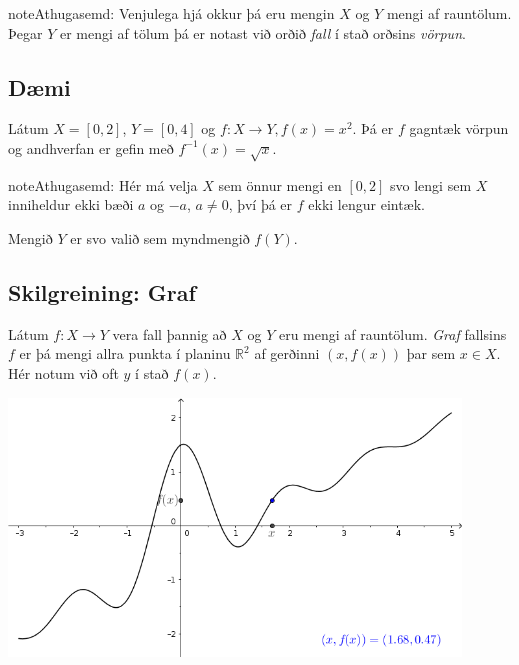 \documentclass[a4paper,10pt,icelandic]{sphinxmanual}
\begin{document}

\begin{notice}{note}{Athugasemd:}
Venjulega hjá okkur þá eru mengin \(X\) og \(Y\)
mengi af rauntölum. Þegar \(Y\) er mengi af tölum þá er notast við
orðið \textit{fall} í stað orðsins \emph{vörpun}.
\end{notice}


\subsection{Dæmi}
\label{kafli01:index-9}\label{kafli01:id2}
Látum \(X=[0,2]\), \(Y=[0,4]\) og \(f:X \to Y, f(x) = x^2\).
Þá er \(f\) gagntæk vörpun og andhverfan er gefin með
\(f^{-1}(x) = \sqrt x\).


\begin{notice}{note}{Athugasemd:}
Hér má velja \(X\) sem önnur mengi en \([0,2]\) svo lengi sem
\(X\) inniheldur ekki bæði \(a\) og \(-a\), \(a\neq 0\),
því þá er \(f\) ekki lengur eintæk.

Mengið \(Y\) er svo valið sem myndmengið \(f(Y)\).
\end{notice}


\subsection{Skilgreining: Graf}
\label{kafli01:skilgreining-graf}
Látum \(f:X \to Y\) vera fall þannig að \(X\)
og \(Y\) eru mengi af rauntölum. \textit{Graf} fallsins \(f\) er þá
mengi allra punkta í planinu \(\mathbb{R}^2\) af gerðinni
\((x,f(x))\) þar sem \(x\in X\). Hér notum við oft \(y\) í stað
\(f(x)\).


\begin{center}
\includegraphics[width=12cm,keepaspectratio=true]{04_Graf_falls.png}
\end{center}
\end{document}
